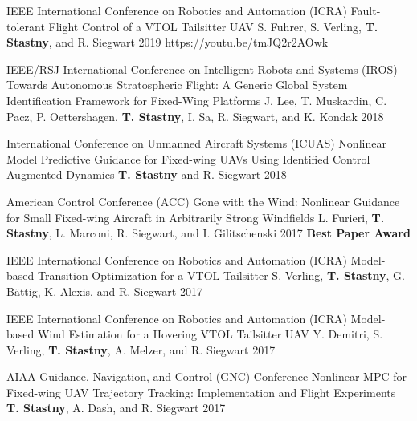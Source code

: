 \begin{cventries}
\begin{cvnumlist}
\item \cvpubentry
	{IEEE International Conference on Robotics and Automation (ICRA)} %
	{Fault-tolerant Flight Control of a VTOL Tailsitter UAV} %
	{S. Fuhrer, S. Verling, \textbf{T. Stastny}, and R. Siegwart} %
	{} %
	{2019} %
	{https://youtu.be/tmJQ2r2AOwk} %
	{} %

\item \cvpubentry
	{IEEE/RSJ International Conference on Intelligent Robots and Systems (IROS)} %
	{Towards Autonomous Stratospheric Flight: A Generic Global System Identification Framework for Fixed-Wing Platforms} %
	{J. Lee, T. Muskardin, C. Pacz, P. Oettershagen, \textbf{T. Stastny}, I. Sa, R. Siegwart, and K. Kondak} %
	{} %
	{2018} %
	{} %
	{} %

\item \cvpubentry
	{International Conference on Unmanned Aircraft Systems (ICUAS)} %
	{Nonlinear Model Predictive Guidance for Fixed-wing UAVs Using Identified Control Augmented Dynamics} %
	{\textbf{T. Stastny} and R. Siegwart} %
	{} %
	{2018} %
	{} %
	{} %

\item \cvpubentry
	{American Control Conference (ACC)} %
	{Gone with the Wind: Nonlinear Guidance for Small Fixed-wing Aircraft in Arbitrarily Strong Windfields} %
	{L. Furieri, \textbf{T. Stastny}, L. Marconi, R. Siegwart, and I. Gilitschenski} %
	{} %
	{2017} %
	{} %
	{\textbf{Best Paper Award}} %
	
\item \cvpubentry
	{IEEE International Conference on Robotics and Automation (ICRA)} %
	{Model-based Transition Optimization for a VTOL Tailsitter} %
	{S. Verling, \textbf{T. Stastny}, G. B{\"a}ttig, K. Alexis, and R. Siegwart} %
	{} %
	{2017} %
	{} %
	{} %
	
\item \cvpubentry
	{IEEE International Conference on Robotics and Automation (ICRA)} %
	{Model-based Wind Estimation for a Hovering VTOL Tailsitter UAV} %
	{Y. Demitri, S. Verling, \textbf{T. Stastny}, A. Melzer, and R. Siegwart} %
	{} %
	{2017} %
	{} %
	{} %
		
\item \cvpubentry
	{AIAA Guidance, Navigation, and Control (GNC) Conference} %
	{Nonlinear MPC for Fixed-wing UAV Trajectory Tracking: Implementation and Flight Experiments} %
	{\textbf{T. Stastny}, A. Dash, and R. Siegwart} %
	{} %
	{2017} %
	{} %
	{} %


\end{cvnumlist}
\end{cventries}
